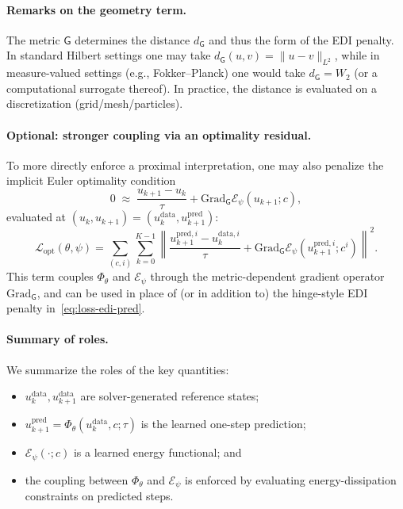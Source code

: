 \documentclass[11pt]{article}
\newcommand{\Grad}{\mathrm{Grad}}
\begin{document}
\paragraph{Remarks on the geometry term.}
The metric $\mathsf G$ determines the distance $d_{\mathsf G}$ and thus the form of the EDI penalty.
In standard Hilbert settings one may take $d_{\mathsf G}(u,v)=\|u-v\|_{L^2}$, while in measure-valued settings (e.g., Fokker--Planck) one would take $d_{\mathsf G}=W_2$ (or a computational surrogate thereof).
In practice, the distance is evaluated on a discretization (grid/mesh/particles).

\paragraph{Optional: stronger coupling via an optimality residual.}
To more directly enforce a proximal interpretation, one may also penalize the implicit Euler optimality condition
\begin{equation}
\label{eq:implicit-opt}
0 \;\approx\; \frac{u_{k+1}-u_k}{\tau} + \Grad_{\mathsf G}\mathcal E_\psi(u_{k+1};c),
\end{equation}
evaluated at $(u_k,u_{k+1})=(u_k^{\mathrm{data}},u_{k+1}^{\mathrm{pred}})$:
\begin{equation}
\label{eq:loss-optres}
\mathcal L_{\mathrm{opt}}
(\theta,\psi)
=
\sum_{(c,i)}\sum_{k=0}^{K-1}
\left\|
\frac{u_{k+1}^{\mathrm{pred},i}-u_k^{\mathrm{data},i}}{\tau}
+
\Grad_{\mathsf G}\mathcal E_\psi(u_{k+1}^{\mathrm{pred},i};c^{i})
\right\|^2.
\end{equation}
This term couples $\Phi_\theta$ and $\mathcal E_\psi$ through the metric-dependent gradient operator $\Grad_{\mathsf G}$, and can be used in place of (or in addition to) the hinge-style EDI penalty in~\eqref{eq:loss-edi-pred}.

\paragraph{Summary of roles.}
We summarize the roles of the key quantities:
\begin{itemize}[itemsep=-2pt, topsep=2pt]
\item[(i)] $u_k^{\mathrm{data}},u_{k+1}^{\mathrm{data}}$ are solver-generated reference states;
\item[(ii)] $u_{k+1}^{\mathrm{pred}}=\Phi_\theta(u_k^{\mathrm{data}},c;\tau)$ is the learned one-step prediction;
\item[(iii)] $\mathcal E_\psi(\cdot;c)$ is a learned energy functional; and
\item[(iv)] the coupling between $\Phi_\theta$ and $\mathcal E_\psi$ is enforced by evaluating energy-dissipation constraints on predicted steps.
\end{itemize}
\end{document}
